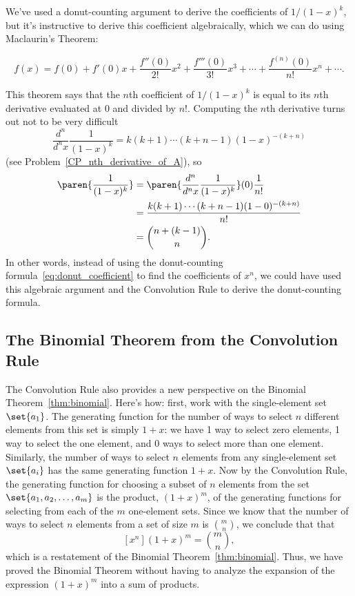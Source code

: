 We've used a donut-counting argument to derive the coefficients of
$1/(1-x)^k$, but it's instructive to derive this coefficient
algebraically, which we can do using Maclaurin's Theorem:
\begin{theorem}\label{thm:maclauren}
\[
f(x) = f(0) + f'(0) x + \frac{f''(0)}{2!} x^2 + \frac{f'''(0)}{3!} x^3 + \cdots
+ \frac{f^{(n)}(0)}{n!} x^n + \cdots.
\]
\end{theorem}

This theorem says that the $n$th coefficient of $1 / (1 - x)^k$ is
equal to its $n$th derivative evaluated at 0 and divided by $n!$.
Computing the $n$th derivative turns out not to be very difficult
\[
\frac{d^n}{d^n x} \frac{1}{(1-x)^k} = k (k+1) \cdots (k + n - 1)(1-x)^{-(k+n)}
\]
(see Problem~\ref{CP_nth_derivative_of_A}), so
\begin{align*}
[x^n]\paren{\frac{1}{(1-x)^k}}
  & = \paren{\frac{d^n}{d^n x} \frac{1}{(1-x)^k}}(0)\frac{1}{n!}\\
  & = \frac{k (k+1) \cdots (k + n - 1)(1-0)^{-(k+n)}}{n!}\\
  & = \binom{n+ (k-1)}{n}.
\end{align*}
In other words, instead of using the donut-counting
formula~\eqref{eq:donut_coefficient} to find the coefficients of
$x^n$, we could have used this algebraic argument and the Convolution
Rule to derive the donut-counting formula.

\subsection{The Binomial Theorem from the Convolution Rule}

The Convolution Rule also provides a new perspective on the Binomial
Theorem~\ref{thm:binomial}.  Here's how: first, work with the
single-element set $\set{a_1}$.  The generating function for the
number of ways to select $n$ different elements from this set is
simply $1 + x$: we have 1 way to select zero elements, 1 way to select
the one element, and 0 ways to select more than one element.
Similarly, the number of ways to select $n$ elements from any
single-element set $\set{a_i}$ has the same generating function $1 +
x$.  Now by the Convolution Rule, the generating function for choosing
a subset of $n$ elements from the set $\set{a_1,a_2,\dots,a_m}$ is the
product, $(1+x)^m$, of the generating functions for selecting from each
of the $m$ one-element sets.  Since we know that the number of ways to
select $n$ elements from a set of size $m$ is $\binom{m}{n}$, we
conclude that that
\[
[x^n](1+x)^m = \binom{m}{n},
\]
which is a restatement of the Binomial Theorem~\ref{thm:binomial}.
Thus, we have proved the Binomial Theorem without having to analyze
the expansion of the expression $(1+x)^m$ into a sum of products.

